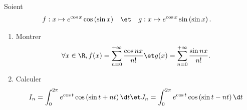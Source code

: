 \begin{enonce}
\begin{exercise}[ID={RMS124 E1258 TPE},subtitle={},tags={}]
Soient 
\begin{align*}
f&: x\mapsto e^{\cos x}\cos\left( \sin x \right)&
&\et&
g&: x\mapsto e^{\cos x}\sin\left( \sin x \right).
\end{align*}
\begin{enumerate}
  \item Montrer 
  \begin{equation*}
    \forall x\in\R,
    f(x) = \sum_{n=0}^{+\infty} \frac{\cos nx}{n!}
    \et
    g(x)=\sum_{n=0}^{+\infty} \frac{\sin nx}{n!}.
  \end{equation*}
  \item Calculer
    \begin{equation*}
      I_n = \int_0^{2\pi} e^{\cos t}\cos\left( \sin t + nt \right)\d t
      \et
      J_n = \int_0^{2\pi} e^{\cos t}\cos\left( \sin t - nt \right)\d t
    \end{equation*}
\end{enumerate}
\end{exercise}
\begin{solution}
\end{solution}
\end{enonce}
